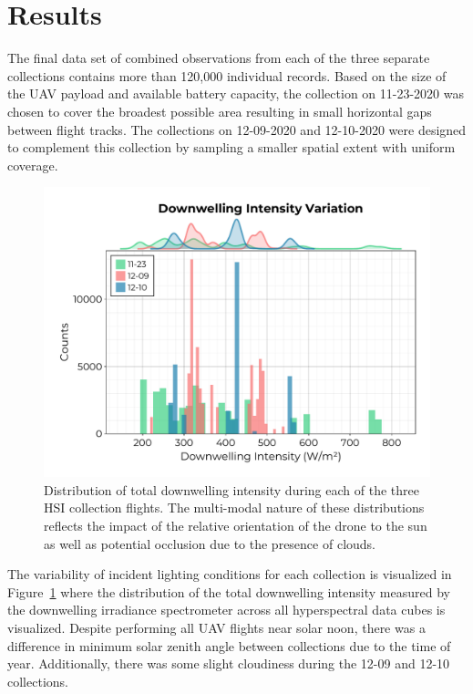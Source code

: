 \documentclass[remotesensing,article,submit,pdftex,moreauthors]{Definitions/mdpi}
\begin{document}
\section{Results}

The final data set of combined observations from each of the three separate collections contains more than 120,000 individual records. Based on the size of the UAV payload and available battery capacity, the collection on 11-23-2020 was chosen to cover the broadest possible area resulting in small horizontal gaps between flight tracks. The collections on 12-09-2020 and 12-10-2020 were designed to complement this collection by sampling a smaller spatial extent with uniform coverage.

\begin{figure}[t!]
\vspace{-0.2in}
\includegraphics[width=0.7\columnwidth]{paper/figures/results/downwelling-hist.pdf}
\vspace{-0.2in}
\caption{Distribution of total downwelling intensity during each of the three HSI collection flights. The multi-modal nature of these distributions reflects the impact of the relative orientation of the drone to the sun as well as potential occlusion due to the presence of clouds.\label{fig:downwelling-hist}}
\end{figure}   

The variability of incident lighting conditions for each collection is visualized in Figure~\ref{fig:downwelling-hist} where the distribution of the total downwelling intensity measured by the downwelling irradiance spectrometer across all hyperspectral data cubes is visualized. Despite performing all UAV flights near solar noon, there was a difference in minimum solar zenith angle between collections due to the time of year. Additionally, there was some slight cloudiness during the 12-09 and 12-10 collections. 
\end{document}
